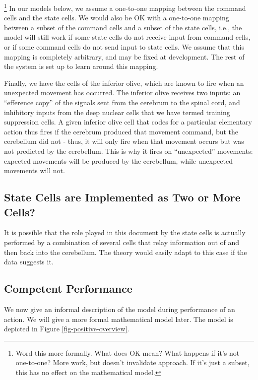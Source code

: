 \documentclass{article}
\theoremstyle{definition}
\begin{document}
\footnote{Word this more formally. What does OK mean? What happens if it's
  not one-to-one? More work, but doesn't invalidate approach. If it's
  just a subset, this has no effect on the mathematical model.} In our
models below, we assume a one-to-one mapping between the command cells
and the state cells. We would also be OK with a one-to-one mapping
between a subset of the command cells and a subset of the state cells,
i.e., the model will still work if some state cells do not receive
input from command cells, or if some command cells do not send input
to state cells. We assume that this mapping is completely arbitrary,
and may be fixed at development. The rest of the system is set up to
learn around this mapping.

Finally, we have the cells of the inferior olive, which are known to
fire when an unexpected movement has occurred. The inferior olive
receives two inputs: an ``efference copy'' of the signals sent from
the cerebrum to the spinal cord, and inhibitory inputs from the deep
nuclear cells that we have termed training suppression cells. A given
inferior olive cell that codes for a particular elementary action thus
fires if the cerebrum produced that movement command, but the
cerebellum did not - thus, it will only fire when that movement occurs
but was not predicted by the cerebellum. This is why it fires on
``unexpected'' movements: expected movements will be produced by the
cerebellum, while unexpected movements will not.

\subsection{State Cells are Implemented as Two or More Cells?}

It is possible that the role played in this document by the state
cells is actually performed by a combination of several cells that
relay information out of and then back into the cerebellum. The theory
would easily adapt to this case if the data suggests it.

\subsection{Competent Performance}

We now give an informal description of the model during performance of
an action. We will give a more formal mathematical model later. The
model is depicted in Figure \ref{fig-positive-overview}.
\end{document}
